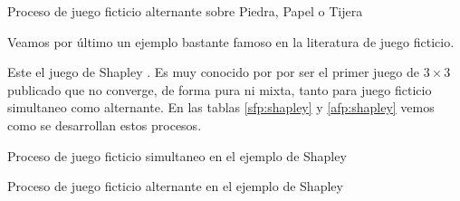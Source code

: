 \begin{table} %
    \centering
    
    \caption{Proceso de juego ficticio alternante sobre Piedra, Papel o Tijera}
    \label{afp:piedra:papel:tijera}
\end{table}

Veamos por último un ejemplo bastante famoso en la literatura de juego ficticio.



Este el juego de Shapley \cite{shapley:3x3}. Es muy conocido por por ser el primer juego de $3 \times 3$ publicado que no converge, de forma pura ni mixta, tanto para juego ficticio simultaneo como alternante. En las tablas \ref{sfp:shapley} y \ref{afp:shapley} vemos como se desarrollan estos procesos.


\begin{table} %
    \centering
    
    \caption{Proceso de juego ficticio simultaneo en el ejemplo de Shapley}
    \label{sfp:shapley}
\end{table}
\begin{table} %
    \centering
    
    \caption{Proceso de juego ficticio alternante en el ejemplo de Shapley}
    \label{afp:shapley}
\end{table}

